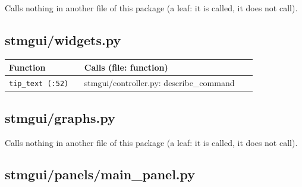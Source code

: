 Calls nothing in another file of this package (a leaf: it is called, it does not call).

\subsection{stmgui/widgets.py}

\small\setlength{\LTleft}{0pt}\setlength{\LTright}{\fill}
\begin{longtable}{@{}>{\raggedright\arraybackslash}p{0.280\linewidth}>{\raggedright\arraybackslash}p{0.640\linewidth}@{}}
\toprule
\textbf{Function} & \textbf{Calls (file: function)} \\
\midrule\endhead
\texttt{tip\_\discretionary{}{}{}text (:52)} & stmgui/controller.py: describe\_command \\
\bottomrule
\end{longtable}
\normalsize

\subsection{stmgui/graphs.py}

Calls nothing in another file of this package (a leaf: it is called, it does not call).

\subsection{stmgui/panels/main\_panel.py}

